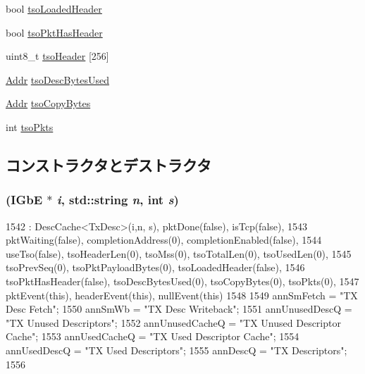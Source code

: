 \begin{DoxyCompactItemize}
\item 
bool \hyperlink{classIGbE_1_1TxDescCache_aea6ed56838e016f0ad81353c348b62cb}{tsoLoadedHeader}
\item 
bool \hyperlink{classIGbE_1_1TxDescCache_a3e767a1c20550a9a1f1c04e0900475d3}{tsoPktHasHeader}
\item 
uint8\_\-t \hyperlink{classIGbE_1_1TxDescCache_a3309d8f5e1d64bb4d1ce8a654d406094}{tsoHeader} \mbox{[}256\mbox{]}
\item 
\hyperlink{base_2types_8hh_af1bb03d6a4ee096394a6749f0a169232}{Addr} \hyperlink{classIGbE_1_1TxDescCache_a9db8e95f501ae2399c15308b5fd40905}{tsoDescBytesUsed}
\item 
\hyperlink{base_2types_8hh_af1bb03d6a4ee096394a6749f0a169232}{Addr} \hyperlink{classIGbE_1_1TxDescCache_a4e886802f97241586f0f9e59d4d3b27e}{tsoCopyBytes}
\item 
int \hyperlink{classIGbE_1_1TxDescCache_a50260682f8c2508080a0c2c51727b40c}{tsoPkts}
\end{DoxyCompactItemize}


\subsection{コンストラクタとデストラクタ}
\hypertarget{classIGbE_1_1TxDescCache_a5c53fad45a69d0f3c20bd08b980a2485}{
\subsubsection[{TxDescCache}]{ ({\bf IGbE} $\ast$ {\em i}, \/  std::string {\em n}, \/  int {\em s})}}
\label{classIGbE_1_1TxDescCache_a5c53fad45a69d0f3c20bd08b980a2485}



\begin{DoxyCode}
1542     : DescCache<TxDesc>(i,n, s), pktDone(false), isTcp(false),
1543       pktWaiting(false), completionAddress(0), completionEnabled(false),
1544       useTso(false), tsoHeaderLen(0), tsoMss(0), tsoTotalLen(0), tsoUsedLen(0),
1545       tsoPrevSeq(0), tsoPktPayloadBytes(0), tsoLoadedHeader(false),
1546       tsoPktHasHeader(false), tsoDescBytesUsed(0), tsoCopyBytes(0), tsoPkts(0),
1547       pktEvent(this), headerEvent(this), nullEvent(this)
1548 {
1549     annSmFetch = "TX Desc Fetch";
1550     annSmWb = "TX Desc Writeback";
1551     annUnusedDescQ = "TX Unused Descriptors";
1552     annUnusedCacheQ = "TX Unused Descriptor Cache";
1553     annUsedCacheQ = "TX Used Descriptor Cache";
1554     annUsedDescQ = "TX Used Descriptors";
1555     annDescQ = "TX Descriptors";
1556 }
\end{DoxyCode}


